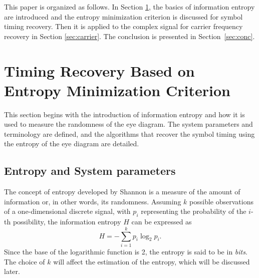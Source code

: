 \documentclass[journal,comsoc]{IEEEtran}
\begin{document}
This paper is organized as follows.
In Section \ref{sec:timing}, the basics of information entropy are introduced and 
the entropy minimization criterion is discussed for symbol timing recovery.
Then it is applied to the complex signal for carrier frequency recovery in Section \ref{sec:carrier}.
The conclusion is presented in Section~\ref{sec:conc}.

\section{Timing Recovery Based on Entropy Minimization Criterion}
\label{sec:timing}
This section begins with the introduction of information entropy and how it is used to measure the randomness of the eye diagram. 
The system parameters and terminology are defined, 
and the algorithms that recover the symbol timing using the entropy of the eye diagram are detailed.

\subsection{Entropy and System parameters}
\label{sec:entropy_assumption}
The concept of entropy developed by Shannon is a measure of the amount of information or, in other words, its randomness.
Assuming \(k\) possible observations of a one-dimensional discrete signal,
with \(p_i\) representing the probability of the \(i\)-th possibility,
the information entropy \(H\) can be expressed as
\begin{equation}
H =  - \sum\limits_{i = 1}^k {{p_i}\log_2 {p_i}}.
\label{eq:entropy}
\end{equation}
Since the base of the logarithmic function is 2, 
the entropy is said to be in \textit{bits}.
The choice of \(k\) will affect the estimation of the entropy, which will be discussed later.
\end{document}
